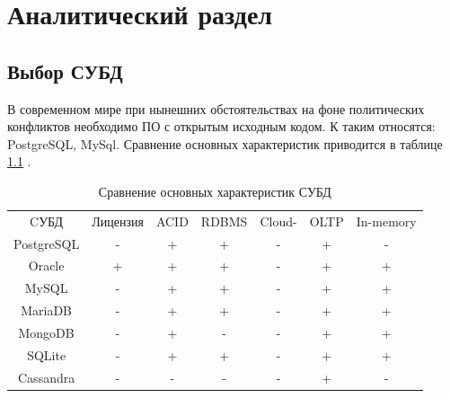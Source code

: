 \chapter{Аналитический раздел}
\section{Выбор СУБД}
В современном мире при нынешних обстоятельствах на фоне политических конфликтов необходимо ПО с открытым исходным кодом. К таким относятся: PostgreSQL, MySql. Сравнение основных характеристик приводится в таблице \ref{table:dbms} \cite{comparative_db}.

\begin{table}[ht!]
	\centering
	\captionsetup{singlelinecheck = false, justification=raggedleft}
	\caption{Сравнение основных характеристик СУБД}
	\label{table:dbms}
	\begin{tabular}{|c|c|c|c|c|c|c|}
		\hline	
		\multirow{2}{*}{CУБД}  & \multirow{2}{*}{Лицензия} & \multirow{2}{*}{ACID}   &\multirow{2}{*}{RDBMS}  & \multirow{2}{*}{Cloud-} & \multirow{2}{*}{OLTP} & \multirow{2}{*}{In-memory} \\
					&		   &	    &	  & only &  &  \\
		\hline
		PostgreSQL  & -  	   & +  	& +   & -  & +  & - \\ \hline
		Oracle  	& +	       & +  	& +   & -  & +  & + \\ \hline
		MySQL	    & -	       & +		& +	  &	-  & +  & + \\ \hline
		MariaDB		& -	       & +		& +	  & -  & +	& + \\ \hline
		MongoDB		& -  	   & +		& -	  & -  & +	& + \\ \hline
		SQLite		& -		   & +		& +	  &	-  & +	& + \\ \hline
		Cassandra	& -		   & -		& -	  &	-  & +	& -  \\ \hline
		\hline
	\end{tabular}
\end{table}

